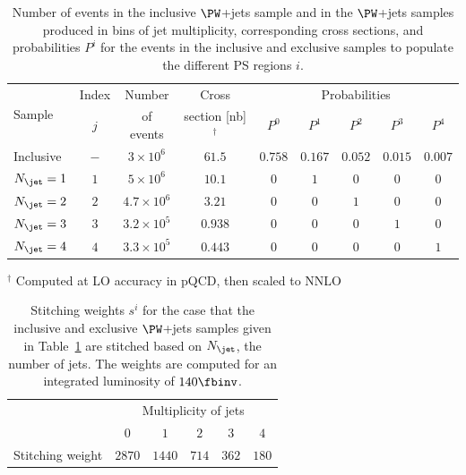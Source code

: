 \begin{table}[h!]
\begin{center}
\def\arraystretch{1.3}
\begin{tabular}{l|c|c|c|ccccc}
\hline
\multirow{2}{20mm}{Sample} & Index & Number    & Cross                    & \multicolumn{5}{c}{Probabilities}               \\
                           & $j$   & of events & section [nb]$^{\dagger}$ & $P^{0}$ & $P^{1}$ & $P^{2}$ & $P^{3}$ & $P^{4}$ \\
\hline
\hline
Inclusive                  & $-$   & $3 \times 10^{6}$ & $61.5$ & $0.758$ & $0.167$ & $0.052$ & $0.015$ & $0.007$ \\
\hline
$N_{\jet} = 1$             & $1$   & $5 \times 10^{6}$   & $10.1$  & $0$     & $1$     & $0$     & $0$     & $0$  \\
$N_{\jet} = 2$             & $2$   & $4.7 \times 10^{6}$ & $3.21$  & $0$     & $0$     & $1$     & $0$     & $0$  \\
$N_{\jet} = 3$             & $3$   & $3.2 \times 10^{5}$ & $0.938$ & $0$     & $0$     & $0$     & $1$     & $0$  \\
$N_{\jet} = 4$             & $4$   & $3.3 \times 10^{5}$ & $0.443$ & $0$     & $0$     & $0$     & $0$     & $1$  \\
\hline
\end{tabular}
\end{center}
$^{\dagger}$ Computed at LO accuracy in pQCD, then scaled to NNLO
\caption{
  Number of events in the inclusive $\PW$+jets sample and in the $\PW$+jets samples produced in bins of jet multiplicity,
  corresponding cross sections,
  and probabilities $P^{i}$ for the events in the inclusive and exclusive samples to populate the different PS regions $i$.
}
\label{tab:samples_and_probabilities_WJets_vs_Njet}
\end{table}

\begin{table}[h!]
\begin{center}
\begin{tabular}{l|ccccc}
\hline
 & \multicolumn{5}{c}{Multiplicity of jets} \\
 & $0$ & $1$ & $2$ & $3$ & $4$ \\
\hline
\hline
Stitching weight & $2870$ & $1440$ & $714$ & $362$ & $180$ \\
\hline
\end{tabular}
\end{center}
\caption{
  Stitching weights $s^{i}$ for the case that the inclusive and exclusive $\PW$+jets samples 
  given in Table~\ref{tab:samples_and_probabilities_WJets_vs_Njet}
  are stitched based on $N_{\jet}$, the number of jets.
  The weights are computed for an integrated luminosity of $140\fbinv$.
}
\label{tab:weights_WJets_vs_Njet}
\end{table}

